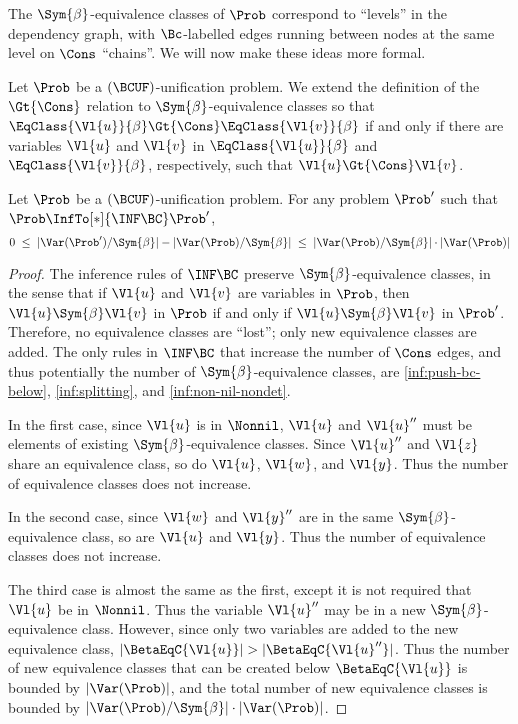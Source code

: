 The $\Sym{\beta}$-equivalence classes of $\Prob$ correspond to ``levels'' in
the dependency graph, with $\Bc$-labelled edges running between nodes at the
same level on $\Cons$ ``chains''. We will now make these ideas more formal.

\begin{Definition}
    Let $\Prob$ be a $(\BCUF)$-unification problem. We extend the definition of
    the $\Gt{\Cons}$ relation to $\Sym{\beta}$-equivalence classes so that
    $\EqClass{\Vl{u}}{\beta} \Gt{\Cons} \EqClass{\Vl{v}}{\beta}$ if and only if
    there are variables $\Vl{u}$ and $\Vl{v}$ in $\EqClass{\Vl{u}}{\beta}$ and
    $\EqClass{\Vl{v}}{\beta}$, respectively, such that $\Vl{u} \Gt{\Cons}
    \Vl{v}$.
\end{Definition}

\begin{Lemma}\label{lemma:equiv-class-bound}
    Let $\Prob$ be a $(\BCUF)$-unification problem. For any problem $\Prob'$
    such that $\Prob \InfTo[*]{\INF\BC} \Prob'$,
    \[ 0 \; \leq \;
       |\Var(\Prob') / {\Sym{\beta}}| - |\Var(\Prob) / {\Sym{\beta}}| \; \leq \;
       |\Var(\Prob) / {\Sym{\beta}}| \cdot |\Var(\Prob)| \]
\end{Lemma}

\begin{proof}
    The inference rules of $\INF\BC$ preserve $\Sym{\beta}$-equivalence classes,
    in the sense that if $\Vl{u}$ and $\Vl{v}$ are variables in $\Prob$, then
    $\Vl{u} \Sym{\beta} \Vl{v}$ in $\Prob$ if and only if $\Vl{u} \Sym{\beta}
    \Vl{v}$ in $\Prob'$. Therefore, no equivalence classes are ``lost''; only
    new equivalence classes are added.
    The only rules in $\INF\BC$ that increase the number of $\Cons$ edges, and
    thus potentially the number of $\Sym{\beta}$-equivalence classes, are
    \ref{inf:push-bc-below}, \ref{inf:splitting}, and \ref{inf:non-nil-nondet}.

    In the first case, since $\Vl{u}$ is in $\Nonnil$, $\Vl{u}$ and $\Vl{u}''$
    must be elements of existing $\Sym{\beta}$-equivalence classes. Since
    $\Vl{u}''$ and $\Vl{z}$ share an equivalence class, so do $\Vl{u}$,
    $\Vl{w}$, and $\Vl{y}$. Thus the number of equivalence classes does not
    increase.

    In the second case, since $\Vl{w}$ and $\Vl{y}''$ are in the same
    $\Sym{\beta}$-equivalence class, so are $\Vl{u}$ and $\Vl{y}$. Thus the
    number of equivalence classes does not increase.

    The third case is almost the same as the first, except it is not required
    that $\Vl{u}$ be in $\Nonnil$. Thus the variable $\Vl{u}''$ may be in a new
    $\Sym{\beta}$-equivalence class. However, since only two variables are
    added to the new equivalence class, $|\BetaEqC{\Vl{u}}| >
    |\BetaEqC{\Vl{u}''}|$. Thus the number of new equivalence classes that can
    be created below $\BetaEqC{\Vl{u}}$ is bounded by $|\Var(\Prob)|$, and the
    total number of new equivalence classes is bounded by $|\Var(\Prob) /
    {\Sym{\beta}}| \cdot |\Var(\Prob)|$.
\end{proof}

